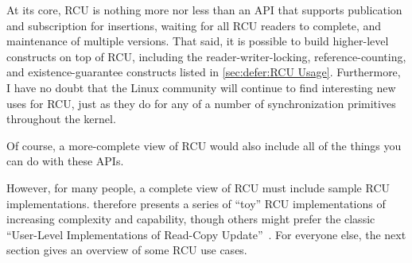 At its core, RCU is nothing more nor less than an API that supports
publication and subscription for insertions, waiting for all RCU readers
to complete, and maintenance of multiple versions.
That said, it is possible to build higher-level constructs
on top of RCU, including the reader-writer-locking, reference-counting,
and existence-guarantee constructs listed in
\cref{sec:defer:RCU Usage}.
Furthermore, I have no doubt that the Linux community will continue to
find interesting new uses for RCU,
just as they do for any of a number of synchronization
primitives throughout the kernel.

Of course, a more-complete view of RCU would also include
all of the things you can do with these APIs.

However, for many people, a complete view of RCU must include sample
RCU implementations.
 therefore presents a series
of ``toy'' RCU implementations of increasing complexity and capability,
though others might prefer the classic
``User-Level Implementations of Read-Copy
Update''~\cite{MathieuDesnoyers2012URCU}.
For everyone else, the next section gives an overview of some RCU use cases.
